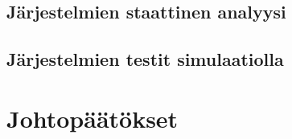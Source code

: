 \documentclass[12pt]{article}
\begin{document}
\subsection{Järjestelmien staattinen analyysi}

\subsection{Järjestelmien testit simulaatiolla}



\section{Johtopäätökset}


\end{document}
